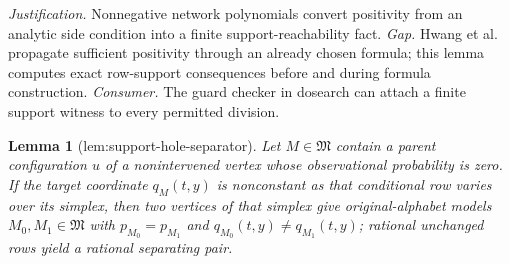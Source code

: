 \documentclass{article}
\newtheorem{lemma}{Lemma}
\begin{document}
\par\smallskip\noindent \textit{Justification.} Nonnegative network polynomials convert positivity from an analytic side condition into a finite support-reachability fact. \textit{Gap.} Hwang et al. propagate sufficient positivity through an already chosen formula; this lemma computes exact row-support consequences before and during formula construction. \textit{Consumer.} The guard checker in dosearch can attach a finite support witness to every permitted division.

\begin{lemma}[lem:support-hole-separator]\label{lem:support-hole-separator}
Let \(M\in\mathfrak M\) contain a parent configuration \(u\) of a nonintervened vertex whose observational probability is zero. If the target coordinate \(q_M(t,y)\) is nonconstant as that conditional row varies over its simplex, then two vertices of that simplex give original-alphabet models \(M_0,M_1\in\mathfrak M\) with \(p_{M_0}=p_{M_1}\) and \(q_{M_0}(t,y)\ne q_{M_1}(t,y)\); rational unchanged rows yield a rational separating pair.
\end{lemma}
\end{document}
